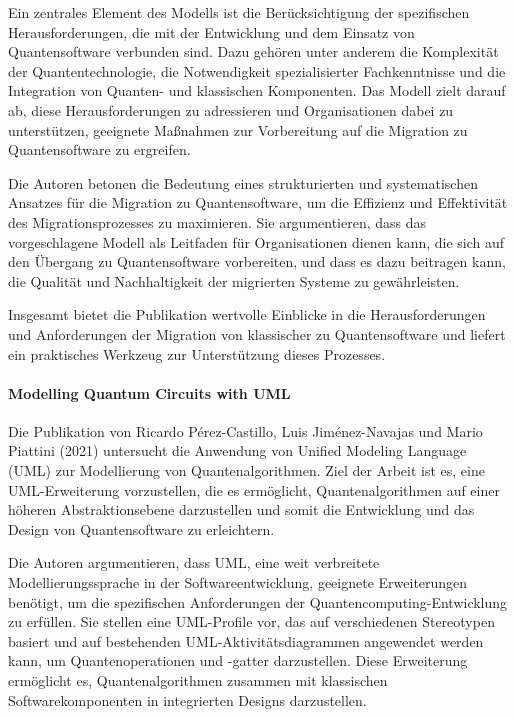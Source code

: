 Ein zentrales Element des Modells ist die Berücksichtigung der spezifischen Herausforderungen, die mit der 
Entwicklung und dem Einsatz von Quantensoftware verbunden sind. Dazu gehören unter anderem die Komplexität der 
Quantentechnologie, die Notwendigkeit spezialisierter Fachkenntnisse und die Integration von Quanten- und 
klassischen Komponenten. Das Modell zielt darauf ab, diese Herausforderungen zu adressieren und Organisationen 
dabei zu unterstützen, geeignete Maßnahmen zur Vorbereitung auf die Migration zu Quantensoftware zu ergreifen.

Die Autoren betonen die Bedeutung eines strukturierten und systematischen Ansatzes für die Migration zu 
Quantensoftware, um die Effizienz und Effektivität des Migrationsprozesses zu maximieren. Sie argumentieren, dass 
das vorgeschlagene Modell als Leitfaden für Organisationen dienen kann, die sich auf den Übergang zu 
Quantensoftware vorbereiten, und dass es dazu beitragen kann, die Qualität und Nachhaltigkeit der 
migrierten Systeme zu gewährleisten.

Insgesamt bietet die Publikation wertvolle Einblicke in die Herausforderungen und Anforderungen der Migration 
von klassischer zu Quantensoftware und liefert ein praktisches Werkzeug zur Unterstützung dieses Prozesses.

\paragraph{Modelling Quantum Circuits with UML}

Die Publikation von Ricardo Pérez-Castillo, Luis Jiménez-Navajas und Mario Piattini (2021) \cite{Perez-Castillo_2021} untersucht die Anwendung 
von Unified Modeling Language (UML) zur Modellierung von Quantenalgorithmen. Ziel der Arbeit ist es, eine 
UML-Erweiterung vorzustellen, die es ermöglicht, Quantenalgorithmen auf einer höheren Abstraktionsebene 
darzustellen und somit die Entwicklung und das Design von Quantensoftware zu erleichtern.

Die Autoren argumentieren, dass UML, eine weit verbreitete Modellierungssprache in der Softwareentwicklung, 
geeignete Erweiterungen benötigt, um die spezifischen Anforderungen der Quantencomputing-Entwicklung zu erfüllen. 
Sie stellen eine UML-Profile vor, das auf verschiedenen Stereotypen basiert und auf bestehenden UML-Aktivitätsdiagrammen 
angewendet werden kann, um Quantenoperationen und -gatter darzustellen. Diese Erweiterung ermöglicht es, 
Quantenalgorithmen zusammen mit klassischen Softwarekomponenten in integrierten Designs darzustellen.


